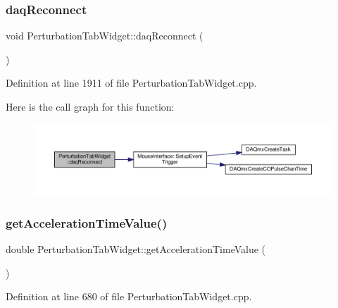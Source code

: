 \subsubsection{\texorpdfstring{daq\+Reconnect}{daqReconnect}}
{\footnotesize\ttfamily void Perturbation\+Tab\+Widget\+::daq\+Reconnect (\begin{DoxyParamCaption}{ }\end{DoxyParamCaption})\hspace{0.3cm}{\ttfamily [slot]}}



Definition at line 1911 of file Perturbation\+Tab\+Widget.\+cpp.

Here is the call graph for this function\+:
\nopagebreak
\begin{figure}[H]
\begin{center}
\leavevmode
\includegraphics[width=350pt]{class_perturbation_tab_widget_a91a2b49c6b8672cd15cce43be89083c2_cgraph}
\end{center}
\end{figure}
\mbox{\label{class_perturbation_tab_widget_a69d99f18f946cd72a3e1963cbc5196f9}} 
\subsubsection{\texorpdfstring{get\+Acceleration\+Time\+Value()}{getAccelerationTimeValue()}}
{\footnotesize\ttfamily double Perturbation\+Tab\+Widget\+::get\+Acceleration\+Time\+Value (\begin{DoxyParamCaption}{ }\end{DoxyParamCaption})}



Definition at line 680 of file Perturbation\+Tab\+Widget.\+cpp.

